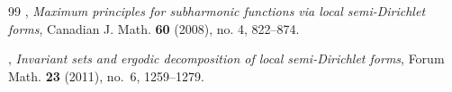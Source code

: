 \documentclass[12pt,a4paper]{article}
\newcommand{\1}{{\bf 1}}
\begin{document}
\begin{thebibliography}{99}
        \bysame, 
         \emph{Maximum principles for subharmonic functions 
         via local semi-Dirichlet forms},   
        Canadian J. Math. {\bf 60} (2008), no. 4, 822--874. 

       \bysame, 
       \emph{Invariant sets and ergodic decomposition of local 
       semi-Dirichlet forms}, Forum Math. {\bf 23} (2011), no.~6, 
       1259--1279. 


%





%
%
%


\end{thebibliography}
\end{document}
